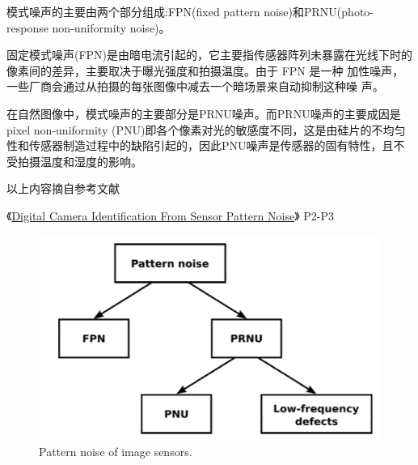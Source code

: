 \documentclass[a4paper,11pt]{article}
\begin{document}
模式噪声的主要由两个部分组成:FPN(fixed pattern noise)和PRNU(photo-response non-uniformity noise)。

固定模式噪声(FPN)是由暗电流引起的，它主要指传感器阵列未暴露在光线下时的像素间的差异，主要取决于曝光强度和拍摄温度。由于 FPN 是一种 加性噪声，一些厂商会通过从拍摄的每张图像中减去一个暗场景来自动抑制这种噪 声。

在自然图像中，模式噪声的主要部分是PRNU噪声。而PRNU噪声的主要成因是pixel non-uniformity (PNU)即各个像素对光的敏感度不同，这是由硅片的不均匀性和传感器制造过程中的缺陷引起的，因此PNU噪声是传感器的固有特性，且不受拍摄温度和湿度的影响。

以上内容摘自参考文献

《\href{https://www.researchgate.net/publication/3455253_Digital_Camera_Identification_From_Sensor_Pattern_Noise?enrichId=rgreq-d1a8e8e6a055ab936531c60ca2752109-XXX&enrichSource=Y292ZXJQYWdlOzM0NTUyNTM7QVM6MjMxNTYwMjQyNzkwNDAwQDE0MzIyMTk2NzIyMjg\%3D&el=1_x_3&_esc=publicationCoverPdf}{Digital Camera Identification From Sensor Pattern Noise}》 P2-P3
\begin{figure}[!htbp]
	\centering
	\includegraphics[scale=0.3]{noise.png}
	\caption{Pattern noise of image sensors.}
	\label{fig:noise}
\end{figure}
\end{document}
